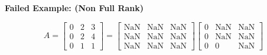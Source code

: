\documentclass[12pt]{article}
\begin{document}
\vspace{\baselineskip}
\vspace{\baselineskip}
\noindent \textbf{Failed Example: (Non Full Rank) }
\begin{center}
	$$
	A = 
		\begin{bmatrix}
		0  &   2  &   3 \\
		0  &   2  &   4 \\
		0  &   1  &   1
		\end{bmatrix}
		=
		\begin{bmatrix}
		\text{NaN} &  \text{NaN} &  \text{NaN} \\
		\text{NaN} &  \text{NaN} &  \text{NaN} \\
		\text{NaN} &  \text{NaN} &  \text{NaN} 
		\end{bmatrix}
		\begin{bmatrix}
		0 &  \text{NaN} &  \text{NaN} \\
		0 &  \text{NaN} &  \text{NaN} \\
		0 &  0 &  \text{NaN} 
		\end{bmatrix}		
	$$
\end{center}
\end{document}
